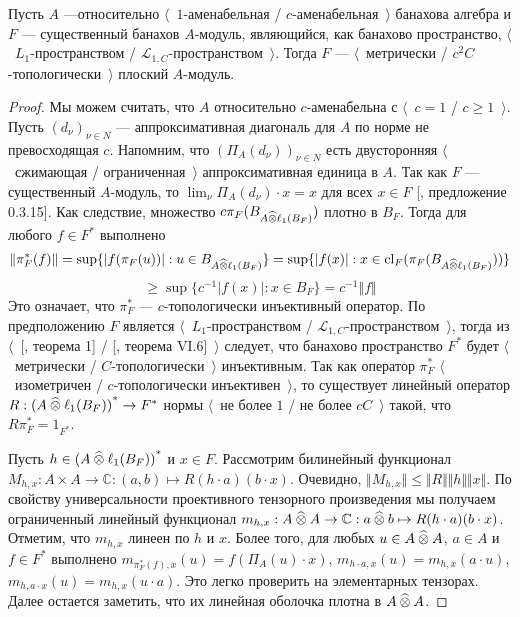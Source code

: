 \begin{proposition}\label{MetTopEssL1FlatModAoverAmenBanAlg} Пусть $A$
---относительно $\langle$~$1$-аменабельная / $c$-аменабельная~$\rangle$ банахова
алгебра и $F$ --- существенный банахов $A$-модуль, являющийся, как банахово
пространство, $\langle$~$L_1$-пространством /
$\mathscr{L}_{1,C}$-пространством~$\rangle$. Тогда $F$ --- $\langle$~метрически
/ $c^2C$-топологически~$\rangle$ плоский $A$-модуль.
\end{proposition}
\begin{proof} 
Мы можем считать, что $A$ относительно $c$-аменабельна с $\langle$~$c=1$ /
$c\geq 1$~$\rangle$. Пусть ${(d_\nu)}_{\nu\in N}$ --- аппроксимативная диагональ
для $A$ по норме не превосходящая $c$. Напомним, что ${(\Pi_A(d_\nu))}_{\nu\in N}$
есть двусторонняя $\langle$~сжимающая / ограниченная~$\rangle$ аппроксимативная
единица в $A$. Так как $F$ --- существенный $A$-модуль, то
$\lim_{\nu}\Pi_A(d_\nu)\cdot x=x$ для всех $x\in F$ [\cite{HelHomolBanTopAlg},
предложение 0.3.15]. Как следствие, множество
$c\pi_F(B_{A\mathbin{\widehat{\otimes}}\ell_1(B_F)})$ плотно в $B_F$. Тогда для любого $f\in F^*$
выполнено
$$
\Vert\pi_F^*(f)\Vert
=\sup \{|f(\pi_F(u))|:u\in B_{A\mathbin{\widehat{\otimes}}\ell_1(B_F)} \}
=\sup \{|f(x)|:x\in \operatorname{cl}_F(\pi_F(B_{A\mathbin{\widehat{\otimes}}\ell_1(B_F)})) \}
$$
$$
\geq\sup \{c^{-1}|f(x)|:x\in B_F \}=c^{-1}\Vert f\Vert
$$
Это означает, что $\pi_F^*$ --- $c$-топологически инъективный оператор. По
предположению $F$ является $\langle$~$L_1$-пространством /
$\mathscr{L}_{1,C}$-пространством~$\rangle$, тогда из
$\langle$~[\cite{GrothMetrProjFlatBanSp}, теорема 1] /
[\cite{StegRethNucOpL1LInfSp}, теорема VI.6]~$\rangle$ следует, что банахово
пространство $F^*$ будет $\langle$~метрически / $C$-топологически~$\rangle$
инъективным. Так как оператор $\pi_F^*$ $\langle$~изометричен /
$c$-топологически инъективен~$\rangle$, то существует линейный оператор
$R:{(A\mathbin{\widehat{\otimes}}\ell_1(B_F))}^*\to F^*$ нормы $\langle$~не более $1$ / не более
$cC$~$\rangle$ такой, что $R\pi_F^*=1_{F^*}$.

Пусть $h\in {(A\mathbin{\widehat{\otimes}}\ell_1(B_F))}^*$ и $x\in F$. Рассмотрим билинейный
функционал $M_{h,x}:A\times A\to\mathbb{C}:(a,b)\mapsto R(h\cdot a)(b\cdot x)$.
Очевидно, $\Vert M_{h,x}\Vert\leq\Vert R\Vert\Vert h\Vert\Vert x\Vert$. По
свойству универсальности проективного тензорного произведения мы получаем
ограниченный линейный функционал $m_{h,x}:A\mathbin{\widehat{\otimes}} A\to\mathbb{C}:a\mathbin{\widehat{\otimes}}
b\mapsto R(h\cdot a)(b\cdot x)$. Отметим, что $m_{h,x}$ линеен по $h$ и $x$.
Более того, для любых $u\in A\mathbin{\widehat{\otimes}} A$, $a\in A$ и $f\in F^*$ выполнено
$m_{\pi_F^*(f),x}(u)=f(\Pi_A(u)\cdot x)$, $m_{h\cdot a,x}(u)=m_{h,x}(a\cdot u)$,
$m_{h,a\cdot x}(u)=m_{h,x}(u\cdot a)$. Это легко проверить на элементарных
тензорах. Далее остается заметить, что их линейная оболочка плотна в $A\mathbin{\widehat{\otimes}}
A$.


\end{proof}
